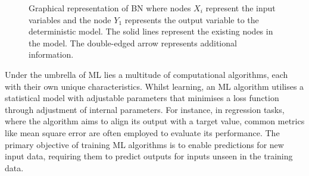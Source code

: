 \documentclass[journal]{IEEEtran}
\begin{document}
\begin{figure}[t]
    \caption{\small Graphical representation of BN where nodes $X_i$ represent the input variables and the node $Y_1$ represents the output variable to the deterministic model. The solid lines represent the existing nodes in the model. The double-edged arrow represents additional information.}\label{fig:BN3} 
\end{figure}

Under the umbrella of ML lies a multitude of computational algorithms, each with their own unique characteristics. Whilst learning, an ML algorithm utilises a statistical model with adjustable parameters that minimises a loss function through adjustment of internal parameters. For instance, in regression tasks, where the algorithm aims to align its output with a target value, common metrics like mean square error are often employed to evaluate its performance. The primary objective of training ML algorithms is to enable predictions for new input data, requiring them to predict outputs for inputs unseen in the training data.
\end{document}
